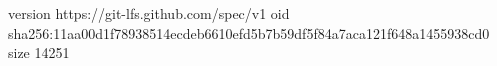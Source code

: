 version https://git-lfs.github.com/spec/v1
oid sha256:11aa00d1f78938514ecdeb6610efd5b7b59df5f84a7aca121f648a1455938cd0
size 14251
